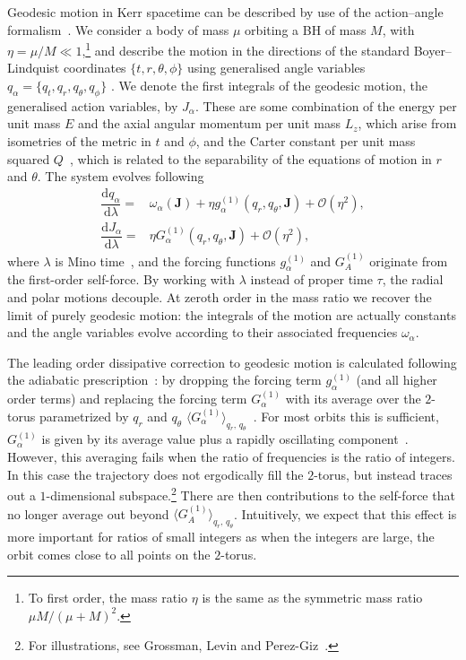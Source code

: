 \documentclass[aps,prd,amsfonts,amssymb,amsmath,nofootinbib,showpacs,superscriptaddress,twocolumn]{revtex4}
\newcommand{\dd}{\ensuremath{\mathrm{d}}}
\newcommand{\diff}[2]{\ensuremath{\dfrac{\dd {#1}}{\dd {#2}}}}
\newcommand{\order}[1]{\ensuremath{\mathcal{O}({#1})}}
\begin{document}
Geodesic motion in Kerr spacetime can be described by use of the action--angle formalism~\cite{Goldstein2002}. %
We consider a body of mass $\mu$ orbiting a BH of mass $M$, with $\eta = \mu/M \ll 1$,\footnote{To first order, the mass ratio $\eta$ is the same as the symmetric mass ratio $\mu M/(\mu+M)^2$.} and describe the motion in the directions of the standard Boyer--Lindquist coordinates $\{t,r,\theta,\phi\}$ using generalised angle variables $q_\alpha = \{q_t,q_r,q_\theta,q_\phi\}$ \citep{Hinderer2008}. We denote the first integrals of the geodesic motion, the generalised action variables, by $J_\alpha$. These are some combination of the energy per unit mass $E$ and the axial angular momentum per unit mass $L_z$, which arise from isometries of the metric in $t$ and $\phi$, and the Carter constant per unit mass squared $Q$~\cite{Carter1968}, which is related to the separability of the equations of motion in $r$ and $\theta$. The system evolves following~\cite{Flanagan2012}
\begin{subequations}
\label{eq:Mino-E-o-M}
\begin{align}
\diff{q_\alpha}{\lambda} = {} & \omega_\alpha(\boldsymbol{J}) + \eta g_\alpha^{(1)}(q_r,q_\theta,\boldsymbol{J}) + \order{\eta^2}, \\
\diff{J_\alpha}{\lambda} = {} & \eta G_\alpha^{(1)}(q_r,q_\theta,\boldsymbol{J}) + \order{\eta^2},
\end{align}
\end{subequations}
where $\lambda$ is Mino time~\cite{Mino2003}, and the forcing functions $g_\alpha^{(1)}$ and $G_A^{(1)}$ originate from the first-order self-force. By working with $\lambda$ instead of proper time $\tau$, the radial and polar motions decouple. At zeroth order in the mass ratio we recover the limit of purely geodesic motion: the integrals of the motion are actually constants and the angle variables evolve according to their associated frequencies $\omega_\alpha$.

The leading order dissipative correction to geodesic motion is calculated following the adiabatic prescription~\cite{Hinderer2008}: by dropping the forcing term $g_\alpha^{(1)}$ (and all higher order terms) and replacing the forcing term $G_\alpha^{(1)}$ with its average over the $2$-torus parametrized by $q_r$ and $q_\theta$ $\langle G_\alpha^{(1)}\rangle_{q_r,\,q_\theta}$~\cite{Drasco2005}. For most orbits this is sufficient, $G_\alpha^{(1)}$ is given by its average value plus a rapidly oscillating component~\cite{Arnold1988}. %
However, this averaging fails when the ratio of frequencies is the ratio of integers. In this case the trajectory does not ergodically fill the $2$-torus, but instead traces out a $1$-dimensional subspace.\footnote{For illustrations, see Grossman, Levin and Perez-Giz~\cite{Grossman2012}.} There are then contributions to the self-force that no longer average out beyond $\langle G_A^{(1)}\rangle_{q_r,\,q_\theta}$. Intuitively, we expect that this effect is more important for ratios of small integers as when the integers are large, the orbit comes close to all points on the $2$-torus.
\end{document}
